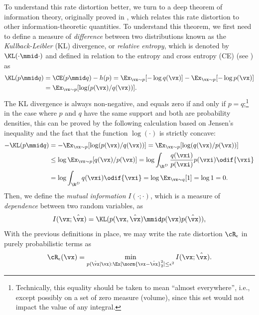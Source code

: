 \documentclass[../../book-main.tex]{subfiles}
\begin{document}
To understand this rate distortion better, we turn to a deep theorem
of information theory, originally proved in
\textcite{shannon1959coding}, which relates this rate distortion to
other information-theoretic quantities. To understand this theorem,
we first need to define a measure of \textit{difference} between two
distributions known as the \textit{Kullback-Leibler} (KL) divergence,
or \textit{relative entropy}, which is denoted by \(\KL(\cdot \mmid
\cdot)\) and defined in relation to the entropy and cross entropy (CE)
(see ) as
\begin{align}
    \KL(p \mmid q) &= \CE(p \mmid q) - h(p) = \Ex_{\vx \sim p}[-\log
    q(\vx)] - \Ex_{\vx \sim p}[-\log p(\vx)] \\
    &= \Ex_{\vx \sim p}[\log (p(\vx)/q(\vx))].
\end{align}
The KL divergence is always non-negative, and equals zero if and only
if \(p = q\);\footnote{Technically, this equality should be taken to
    mean ``almost everywhere'', i.e., except possibly on a set of zero
    measure (volume), since this set would not impact the value of any
integral.} in the case where \(p\) and \(q\) have the same support
and both are probability densities, this can be proved by the
following calculation based on Jensen's inequality and the fact that
the function \(\log(\cdot)\) is strictly concave:
\begin{align}
    - \KL(p\mmid q)
    &= -\Ex_{\vx \sim p}[\log(p(\vx)/q(\vx))] = \Ex_{\vx \sim
    p}[\log(q(\vx)/p(\vx))] \\
    &\leq \log \Ex_{\vx \sim p}[q(\vx)/p(\vx)] =  \log \int_{\R^{D}}
    \frac{q(\vxi)}{p(\vxi)}p(\vxi)\odif{\vxi} \\
    &= \log \int_{\R^{D}}q(\vxi)\odif{\vxi} = \log \Ex_{\vx \sim
    q}[1] = \log 1 = 0.
\end{align}
Then, we define the \textit{mutual information} \(I(\cdot; \cdot)\),
which is a measure of \textit{dependence} between two random variables, as
\begin{equation}\label{eq:mutual-information}
    I(\vx; \hat{\vx})
    = \KL(p(\vx, \hat{\vx}) \mmid p(\vx) p(\hat{\vx})),
\end{equation}
With the previous definitions in place, we may write the rate
distortion \(\cR_{\epsilon}\) in purely probabilistic terms as
\begin{equation}
    \cR_{\epsilon}(\vx)
    = \min_{p(\hat \vx \mid \vx): \Ex[\norm{\vx -\hat \vx}_2^{2}] \le
    \epsilon^{2}}
    I(\vx; \hat{\vx}).
    \label{eqn:rate-distortion-general}
\end{equation}
\end{document}
